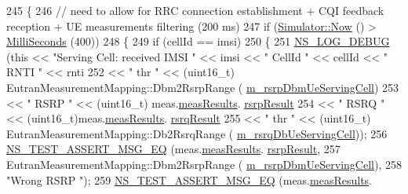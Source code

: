 \begin{DoxyCode}
245 \{
246   \textcolor{comment}{// need to allow for RRC connection establishment + CQI feedback reception + UE measurements filtering
       (200 ms)}
247   \textcolor{keywordflow}{if} (\hyperlink{group__simulator_gac3635e2e87f7ce316c89290ee1b01d0d}{Simulator::Now} () > \hyperlink{group__timecivil_gaf26127cf4571146b83a92ee18679c7a9}{MilliSeconds} (400))
248     \{
249       \textcolor{keywordflow}{if} (cellId == imsi)
250         \{
251           \hyperlink{group__logging_ga413f1886406d49f59a6a0a89b77b4d0a}{NS\_LOG\_DEBUG} (\textcolor{keyword}{this} << \textcolor{stringliteral}{"Serving Cell: received IMSI "} << imsi << \textcolor{stringliteral}{" CellId "} << cellId 
      << \textcolor{stringliteral}{" RNTI "} << rnti
252                              << \textcolor{stringliteral}{" thr "} << (uint16\_t) EutranMeasurementMapping::Dbm2RsrpRange (
      \hyperlink{classLteUeMeasurementsTestCase_a5afd5051a96e8cd850511637ad12aa1d}{m\_rsrpDbmUeServingCell})
253                              << \textcolor{stringliteral}{" RSRP "} << (uint16\_t) meas.\hyperlink{structns3_1_1LteRrcSap_1_1MeasurementReport_a84a65ffec25d719fdcba03fb28ca5b86}{measResults}.
      \hyperlink{structns3_1_1LteRrcSap_1_1MeasResults_a4d7bf8765525493fe5f5cccdbf94ab8b}{rsrpResult}
254                              << \textcolor{stringliteral}{" RSRQ "} << (uint16\_t)meas.\hyperlink{structns3_1_1LteRrcSap_1_1MeasurementReport_a84a65ffec25d719fdcba03fb28ca5b86}{measResults}.
      \hyperlink{structns3_1_1LteRrcSap_1_1MeasResults_a6a64246cfa5d09eb42120890de3dca32}{rsrqResult}
255                              << \textcolor{stringliteral}{" thr "} << (uint16\_t) EutranMeasurementMapping::Db2RsrqRange (
      \hyperlink{classLteUeMeasurementsTestCase_a4f5cb7b7b1948192712b9df5cbba1e0b}{m\_rsrqDbUeServingCell}));
256           \hyperlink{group__testing_ga2a9d78cffb3db8e867c35fff0b698cf5}{NS\_TEST\_ASSERT\_MSG\_EQ} (meas.\hyperlink{structns3_1_1LteRrcSap_1_1MeasurementReport_a84a65ffec25d719fdcba03fb28ca5b86}{measResults}.
      \hyperlink{structns3_1_1LteRrcSap_1_1MeasResults_a4d7bf8765525493fe5f5cccdbf94ab8b}{rsrpResult},
257                                  EutranMeasurementMapping::Dbm2RsrpRange (
      \hyperlink{classLteUeMeasurementsTestCase_a5afd5051a96e8cd850511637ad12aa1d}{m\_rsrpDbmUeServingCell}),
258                                  \textcolor{stringliteral}{"Wrong RSRP "});
259           \hyperlink{group__testing_ga2a9d78cffb3db8e867c35fff0b698cf5}{NS\_TEST\_ASSERT\_MSG\_EQ} (meas.\hyperlink{structns3_1_1LteRrcSap_1_1MeasurementReport_a84a65ffec25d719fdcba03fb28ca5b86}{measResults}.

\end{DoxyCode}
